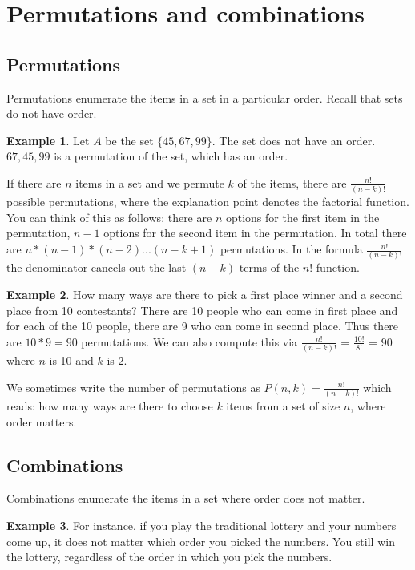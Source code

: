 \documentclass[]{article}
\theoremstyle{definition}
\newtheorem{exmp}{Example}[section]
\begin{document}
\section{Permutations and combinations}

\subsection{Permutations}

Permutations enumerate the items in a set in a particular order. Recall that sets do not have order.

\begin{exmp}
Let $A$ be the set $\{45, 67, 99\}$. The set does not have an order. $67, 45, 99$ is a permutation of the set, which has an order.
\end{exmp} 

If there are $n$ items in a set and we permute $k$ of the items, there are $\frac{n!}{(n-k)!}$ possible permutations, where the explanation point denotes the factorial function. You can think of this as follows: there are $n$ options for the first item in the permutation, $n-1$ options for the second item in the permutation. In total there are $n * (n-1) * (n-2) ... (n - k + 1)$ permutations. In the formula $\frac{n!}{(n-k)!}$ the denominator cancels out the last $(n-k)$ terms of the $n!$ function.

\begin{exmp}
How many ways are there to pick a first place winner and a second place from 10 contestants? There are 10 people who can come in first place and for each of the 10 people, there are 9 who can come in second place. Thus there are $10*9=90$ permutations. We can also compute this via $\frac{n!}{(n-k)!}$ = $\frac{10!}{8!}$ = $90$ where $n$ is 10 and $k$ is 2. 
\end{exmp} 

We sometimes write the number of permutations as $P(n,k) = \frac{n!}{(n-k)!}$ which reads: how many ways are there to choose $k$ items from a set of size $n$, where order matters.

\subsection{Combinations}
Combinations enumerate the items in a set where order does not matter. 

\begin{exmp}
For instance, if you play the traditional lottery and your numbers come up, it does not matter which order you picked the numbers. You still win the lottery, regardless of the order in which you pick the numbers. 
\end{exmp} 
\end{document}
